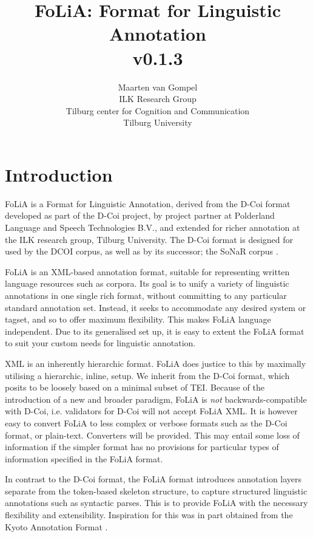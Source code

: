 \documentclass[a4paper,12pt]{report}
\title{FoLiA: Format for Linguistic Annotation \\ \small v0.1.3}
\author{Maarten van Gompel \\ ILK Research Group \\ Tilburg center for Cognition and Communication \\ Tilburg University }
\begin{document}
\sffamily

\maketitle
\tableofcontents


\chapter{Introduction}

FoLiA is a Format for Linguistic Annotation, derived from the D-Coi format\cite{DCOI} developed as part of the D-Coi project, by project partner at Polderland Language and Speech Technologies B.V., and extended for richer annotation at the ILK research group, Tilburg University. The D-Coi format is designed for used by the DCOI corpus, as well as by its successor; the SoNaR corpus \cite{Oostdijk+08}. 

FoLiA is an XML-based\cite{XML} annotation format, suitable for representing written language resources such as corpora. Its goal is to unify a variety of linguistic annotations in one single rich format, without committing to any particular standard annotation set. Instead, it seeks to accommodate any desired system or tagset, and so to offer maximum flexibility. This makes FoLiA language independent. Due to its generalised set up, it is easy to extent the FoLiA format to suit your custom needs for linguistic annotation.

XML is an inherently hierarchic format. FoLiA does justice to this by maximally utilising a hierarchic, inline, setup. We inherit from the D-Coi format, which posits to be loosely based on a minimal subset of TEI\cite{TEI}. Because of the introduction of a new and broader paradigm, FoLiA is \emph{not} backwards-compatible with D-Coi, i.e. validators for D-Coi will not accept FoLiA XML. It is however easy to convert FoLiA to less complex or verbose formats such as the D-Coi format, or plain-text. Converters will be provided. This may entail some loss of information if the simpler format has no provisions for particular types of information specified in the FoLiA format. 


In contrast to the D-Coi format, the FoLiA format introduces annotation layers separate from the token-based skeleton structure, to capture structured linguistic annotations such as syntactic parses. This is to provide FoLiA with the necessary flexibility and extensibility. Inspiration for this was in part obtained from the Kyoto Annotation Format \cite{KYOTO}. 
\end{document}

